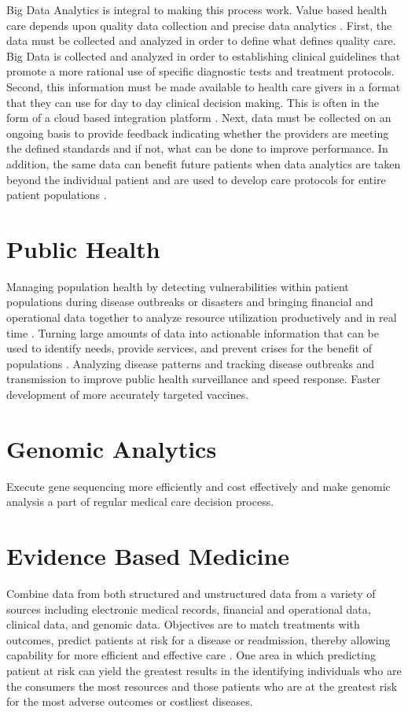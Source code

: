 \documentclass[sigconf]{acmart}
\begin{document}
Big Data Analytics is integral to making this process work. Value based health care depends upon quality data collection and precise data analytics \cite{www-google-liason}.  First, the data must be collected and analyzed in order to define what defines quality care. Big Data is collected and analyzed in order to establishing clinical guidelines that promote a more rational use of specific diagnostic tests and treatment protocols.  Second, this information must be made available to health care givers in a format that they can use for day to day clinical decision making. This is often in the form of a cloud based integration platform \cite{www-google-liason}.  Next, data must be collected on an ongoing basis to provide feedback indicating whether the providers are meeting the defined standards and if not, what can be done to improve performance. In addition, the same data can benefit future patients when data analytics are taken beyond the individual patient and are used to develop care protocols for entire patient populations \cite{www-google-liason}. 

\section{Public Health}
Managing population health by detecting vulnerabilities within patient populations during disease outbreaks or disasters and bringing financial and operational data together to analyze resource utilization productively and in real time \cite{springer}.
Turning large amounts of data into actionable information that can be used to identify needs, provide services, and prevent crises for the benefit of populations \cite{springer}.
Analyzing disease patterns and tracking disease outbreaks and transmission to improve public health surveillance and speed response. Faster development of more accurately targeted vaccines.  

\section{Genomic Analytics}
Execute gene sequencing more efficiently and cost effectively and make genomic analysis a part of regular medical care decision process. 
\section{Evidence Based Medicine}
Combine data from both structured and unstructured data from a variety of sources including electronic medical records, financial and operational data, clinical data, and genomic data. Objectives are to match treatments with outcomes, predict patients at risk for a disease or readmission, thereby allowing capability for more efficient and effective care \cite{springer}.
One area in which predicting patient at risk can yield the greatest results in the identifying individuals who are the consumers the most resources and those patients who are at the greatest risk for the most adverse outcomes or costliest diseases. 
\end{document}
